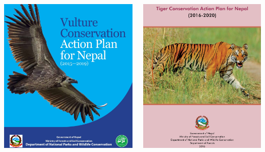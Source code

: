 \documentclass[
  ignorenonframetext,
  aspectratio=169]{beamer}
\newcommand{\bcolumns}{\begin{columns}[T, onlytextwidth]}
\newcommand{\ecolumns}{\end{columns}}
\begin{document}
\begin{frame}{}
\protect\hypertarget{section-5}{}
\bcolumns
{}

\begin{center}\includegraphics[width=0.65\linewidth]{../images/Vulture_conservation_action_plan} \end{center}


\begin{center}\includegraphics[width=0.48\linewidth]{../images/Tiger_recovery_plan} \end{center}

\ecolumns
\end{frame}
\end{document}
